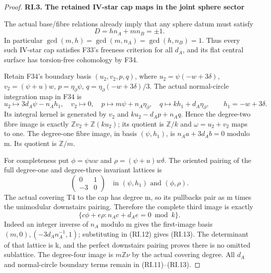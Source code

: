 \begin{proof}
\par

\medskip\noindent\textbf{RI.3. The retained IV-star cap maps in the joint sphere sector}

\par\nobreak

The actual base/fibre relations already imply that any sphere datum
must satisfy
\[
 D=h n_A+m n_B=\pm1.                                    \tag{RI.10}
\]
In particular \(\gcd(m,h)=\gcd(m,n_A)=\gcd(h,n_B)=1\). Thus every such IV-star
cap satisfies F33's freeness criterion for all \(d_A\), and its flat central
surface has torsion-free cohomology by F34.

Retain F34's boundary basis \((u_2,v_2,p,q)\), where
\(u_2=\psi(-w+3\delta)\), \(v_2=(\psi+u)w\), \(p=\eta_\partial\psi\),
\(q=\eta_\partial(-w+3\delta)/3\). The actual normal-circle integration map
in F34 is
\[
 u_2\mapsto3d_A\psi-n_Ah_1,\quad v_2\mapsto0,
 \quad p\mapsto m\psi+n_A\eta_{\partial},\quad
 q\mapsto k h_1+d_A\eta_{\partial},\qquad h_1=-w+3\delta.
                                                               \tag{RI.11}
\]
Its integral kernel is generated by
\(v_2\) and \(ku_2-d_Ap+n_Aq\). Hence the degree-two fibre image is exactly
\(\mathbb Zv_2+\mathbb Z(ku_2)\); its quotient is \(\mathbb Z/k\) and \(\omega=u_2+v_2\) maps to one.
The degree-one fibre image, in basis \((\psi,h_1)\), is
\(n_Aa+3d_Ab=0\) modulo m. Its quotient is \(\mathbb Z/m\).

For completeness put \(\phi=\psi uw\) and \(\rho=(\psi+u)w\delta\). The oriented
pairing of the full degree-one and degree-three invariant lattices is
\[
 \begin{pmatrix}0&1\\-3&0\end{pmatrix}
 \quad\text{in }(\psi,h_1)\text{ and }(\phi,\rho).
                                                               \tag{RI.12}
\]
The actual covering T4 to the cap has degree m, so its pullbacks pair
as m times the unimodular downstairs pairing. Therefore the complete
third image is exactly
\[
 \{c\phi+e\rho:n_Ac+d_Ae=0\bmod k\}.                  \tag{RI.13}
\]
Indeed an integer inverse of \(n_A\) modulo m gives the first-image basis
\((m,0),(-3d_An_A^{-1},1)\); substituting in (RI.12) gives (RI.13).
The determinant of that lattice is k, and the perfect downstairs
pairing proves there is no omitted sublattice. The degree-four image
is \(m\mathbb Z\nu\) by the actual covering degree. All \(d_A\) and normal-circle
boundary terms remain in (RI.11)--(RI.13).


\end{proof}
